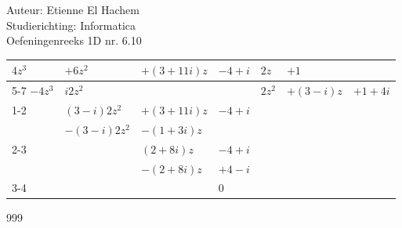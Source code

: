 \documentclass[a4paper]{article}
\begin{document}
  
\noindent \large Auteur: Etienne El Hachem \\
\noindent \large Studierichting: Informatica\\
\noindent \large Oefeningenreeks 1D nr. 6.10\\

\medskip

\normalsize

\begin{tabular}{llll|lll}
$4z^3$ & $+6z^2$ & $+(3 + 11i)z$ & $-4 + i$ & $2z$ & $+1$ & \\ \cline{5-7}
$-4z^3$ & $i2z^2$ & & & $2z^2$ & $+(3 - i)z$ & $+1 + 4i$ \\ \cline{1-2}
& $(3 - i)2z^2$ & $+(3 + 11i)z$ & $-4 + i$ & & & \\
& $-(3 - i)2z^2$ & $-(1+3i)z$ & & & & \\ \cline{2-3}
& & $(2 + 8i)z$ & $-4 + i$ & & & \\
& & $-(2 + 8i)z$ & $+4 - i$ & & & \\ \cline{3-4}
& & & $0$ & & &
\end{tabular}

\begin{thebibliography}{999}
\end{thebibliography}
\end{document}
